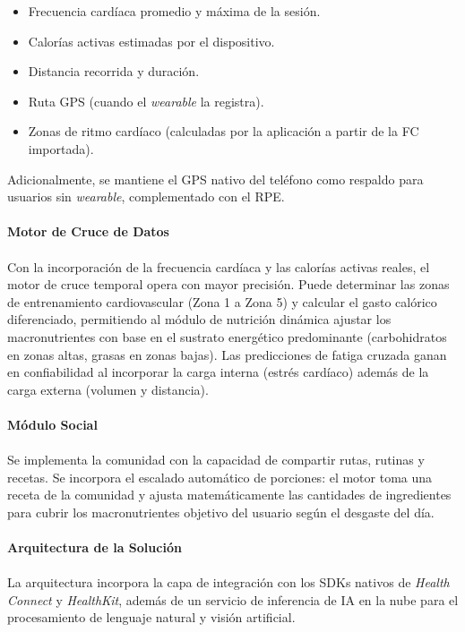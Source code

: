 \documentclass[12pt]{article}
\begin{document}
\begin{itemize}
    \item Frecuencia cardíaca promedio y máxima de la sesión.
    \item Calorías activas estimadas por el dispositivo.
    \item Distancia recorrida y duración.
    \item Ruta GPS (cuando el \textit{wearable} la registra).
    \item Zonas de ritmo cardíaco (calculadas por la aplicación a partir de la FC importada).
\end{itemize}

Adicionalmente, se mantiene el GPS nativo del teléfono como respaldo para usuarios sin \textit{wearable}, complementado con el RPE.
\\\\
\textbf{Motor de Cruce de Datos}
\\\\
Con la incorporación de la frecuencia cardíaca y las calorías activas reales, el motor de cruce temporal opera con mayor precisión. Puede determinar las zonas de entrenamiento cardiovascular (Zona 1 a Zona 5) y calcular el gasto calórico diferenciado, permitiendo al módulo de nutrición dinámica ajustar los macronutrientes con base en el sustrato energético predominante (carbohidratos en zonas altas, grasas en zonas bajas). Las predicciones de fatiga cruzada ganan en confiabilidad al incorporar la carga interna (estrés cardíaco) además de la carga externa (volumen y distancia).
\\\\
\textbf{Módulo Social}
\\\\
Se implementa la comunidad con la capacidad de compartir rutas, rutinas y recetas. Se incorpora el escalado automático de porciones: el motor toma una receta de la comunidad y ajusta matemáticamente las cantidades de ingredientes para cubrir los macronutrientes objetivo del usuario según el desgaste del día.
\\\\
\textbf{Arquitectura de la Solución}
\\\\
La arquitectura incorpora la capa de integración con los SDKs nativos de \textit{Health Connect} y \textit{HealthKit}, además de un servicio de inferencia de IA en la nube para el procesamiento de lenguaje natural y visión artificial.
\end{document}

